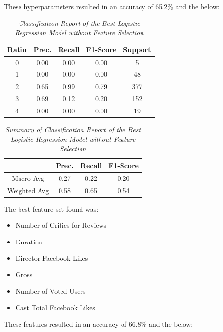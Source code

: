 \documentclass[11pt]{article}
\begin{document}
\noindent
These hyperparameters resulted in an accuracy of 65.2\% and the below:

\begin{table}[!ht]
    \begin{center}
        \begin{tabular}{c|c|c|c|c}			
            \hline
            Ratin & Prec. & Recall & F1-Score & Support \\
            \hline\hline
            0 & 0.00 & 0.00 & 0.00 & 5 \\
            1 & 0.00 & 0.00 & 0.00 & 48 \\
            2 & 0.65 & 0.99 & 0.79 & 377 \\
            3 & 0.69 & 0.12 & 0.20 & 152 \\
            4 & 0.00 & 0.00 & 0.00 & 19\\
                \hline
        \end{tabular}

        \caption{\textit{Classification Report of the Best Logistic Regression Model without Feature Selection}}
        \label{logr-report}

    \end{center}
\end{table}
\begin{table}[!ht]
    \begin{center}
        \begin{tabular}{c||c|c|c}			
            \hline
             & Prec. & Recall & F1-Score \\
            \hline\hline
            Macro Avg & 0.27 & 0.22 & 0.20 \\
            Weighted Avg & 0.58 & 0.65 & 0.54 \\
                \hline
        \end{tabular}

        \caption{\textit{Summary of Classification Report of the Best Logistic Regression Model without Feature Selection}}
        \label{logr-report-sum}

    \end{center}
\end{table}
\noindent
The best feature set found was:
\begin{itemize}
    \item Number of Critics for Reviews
    \item Duration
    \item Director Facebook Likes
    \item Gross
    \item Number of Voted Users
    \item Cast Total Facebook Likes
\end{itemize}
\noindent
These features resulted in an accuracy of 66.8\% and the below:
\end{document}
